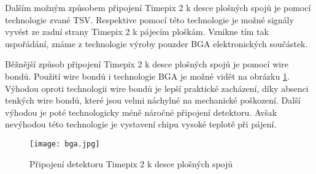 Dalším možným způsobem připojení Timepix 2 k desce plošných spojů je pomocí technologie zvané TSV. Respektive pomocí této technologie je možné signály vyvést ze zadní strany Timepix 2 k pájecím ploškám. Vznikne tím tak uspořádání, známe z technologie výroby pouzder BGA elektronických součástek. 
\par Běžnější způsob připojení Timepix 2 k desce plošných spojů je pomocí wire bondů. Použití wire bondů i technologie BGA je možné vidět na obrázku \ref{fig:bga}. Výhodou oproti technologii wire bondů je lepší praktické zacházení, díky absenci tenkých wire bondů, které jsou velmi náchylné na mechanické poškození. Další výhodou je poté technologicky méně náročné připojení detektoru. Avšak nevýhodou této technologie je vystavení chipu vysoké teplotě při pájení.
\begin{figure}[h!]
	\centering
	\captionsetup{justification=centering}
	\texttt{[image: bga.jpg]}
	\caption{Připojení detektoru Timepix 2 k desce plošných spojů \cite{TSV}} 
	\label{fig:bga}
\end{figure}	









